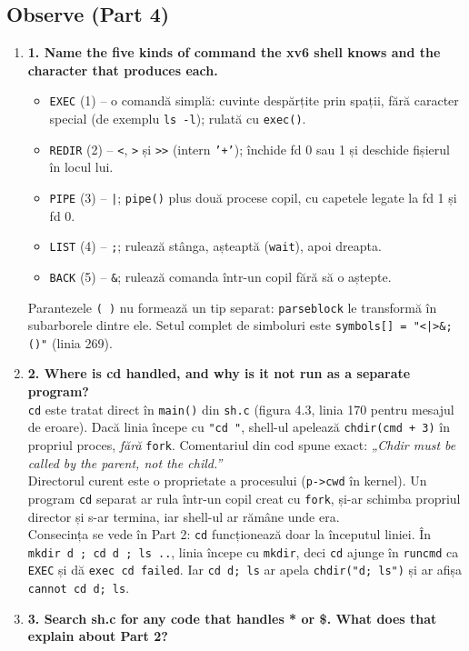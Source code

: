 \documentclass[12pt,a4paper]{article}
\newcommand{\Q}[2]{\item \textbf{#1}\\ #2}
\begin{document}
\subsection*{Observe (Part 4)}
\begin{enumerate}
\Q{1. Name the five kinds of command the xv6 shell knows and the character that produces each.}
{\begin{itemize}
  \item \texttt{EXEC} (1) -- o comandă simplă: cuvinte despărțite prin spații, fără caracter special (de exemplu \texttt{ls -l}); rulată cu \texttt{exec()}.
  \item \texttt{REDIR} (2) -- \texttt{<}, \texttt{>} și \texttt{>>} (intern \texttt{'+'}); închide fd 0 sau 1 și deschide fișierul în locul lui.
  \item \texttt{PIPE} (3) -- \texttt{|}; \texttt{pipe()} plus două procese copil, cu capetele legate la fd 1 și fd 0.
  \item \texttt{LIST} (4) -- \texttt{;}; rulează stânga, așteaptă (\texttt{wait}), apoi dreapta.
  \item \texttt{BACK} (5) -- \texttt{\&}; rulează comanda într-un copil fără să o aștepte.
\end{itemize}
Parantezele \texttt{( )} nu formează un tip separat: \texttt{parseblock} le transformă în subarborele dintre ele. Setul complet de simboluri este \texttt{symbols[] = "<|>\&;()"} (linia 269).}
\Q{2. Where is cd handled, and why is it not run as a separate program?}
{\texttt{cd} este tratat direct în \texttt{main()} din \texttt{sh.c} (figura 4.3, linia 170 pentru mesajul de eroare). Dacă linia începe cu \texttt{"cd "}, shell-ul apelează \texttt{chdir(cmd + 3)} în propriul proces, \emph{fără} \texttt{fork}. Comentariul din cod spune exact: \emph{„Chdir must be called by the parent, not the child.”}\\
Directorul curent este o proprietate a procesului (\texttt{p->cwd} în kernel). Un program \texttt{cd} separat ar rula într-un copil creat cu \texttt{fork}, și-ar schimba propriul director și s-ar termina, iar shell-ul ar rămâne unde era.\\
Consecința se vede în Part 2: \texttt{cd} funcționează doar la începutul liniei. În \texttt{mkdir d ; cd d ; ls ..}, linia începe cu \texttt{mkdir}, deci \texttt{cd} ajunge în \texttt{runcmd} ca \texttt{EXEC} și dă \texttt{exec cd failed}. Iar \texttt{cd d; ls} ar apela \texttt{chdir("d; ls")} și ar afișa \texttt{cannot cd d; ls}.}
\item \textbf{3. Search sh.c for any code that handles * or \$. What does that explain about Part 2?}\\

\end{enumerate}
\end{document}
